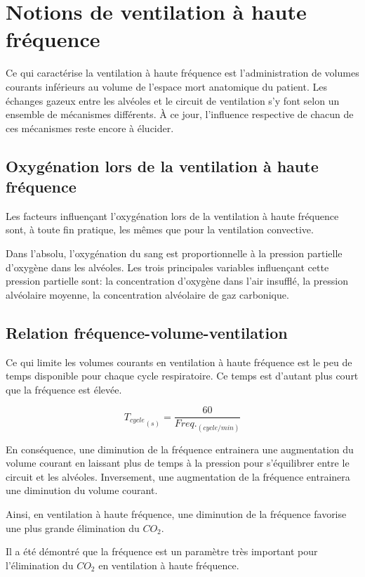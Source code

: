 \section{Notions de ventilation à haute fréquence}

Ce qui caractérise la ventilation à haute fréquence est l'administration de
volumes courants inférieurs au volume de l'espace mort anatomique du patient.
Les échanges gazeux entre les alvéoles et le circuit de ventilation s'y font
selon un ensemble de mécanismes différents. À ce jour, l'influence respective
de chacun de ces mécanismes reste encore à élucider\cite{Pillow2005}.

\subsection{Oxygénation lors de la ventilation à haute fréquence}

Les facteurs influençant l'oxygénation lors de la ventilation à haute fréquence
sont, à toute fin pratique, les mêmes que pour la ventilation convective.

Dans l'absolu, l'oxygénation du sang est proportionnelle à la pression
partielle d'oxygène dans les alvéoles. Les trois principales variables
influençant cette pression partielle sont: la concentration d'oxygène dans
l'air insufflé, la pression alvéolaire moyenne, la concentration alvéolaire de
gaz carbonique.

\subsection{Relation fréquence-volume-ventilation}

Ce qui limite les volumes courants en ventilation à haute fréquence est le peu
de temps disponible pour chaque cycle respiratoire. Ce temps est d'autant plus
court que la fréquence est élevée. 

$$ {T_{cycle}}_{(s)} = \frac{60}{Freq._{(cycle/min)}}$$

En conséquence, une diminution de la fréquence entrainera une augmentation du
volume courant en laissant plus de temps à la pression pour s'équilibrer entre
le circuit et les alvéoles. Inversement, une augmentation de la fréquence
entrainera une diminution du volume courant.

Ainsi, en ventilation à haute fréquence, une diminution de la fréquence
favorise une plus grande élimination du $CO_2$.

Il a été démontré que la fréquence est un paramètre très important pour
l'élimination du $CO_2$ en ventilation à haute fréquence\cite{Pillow2005}.

